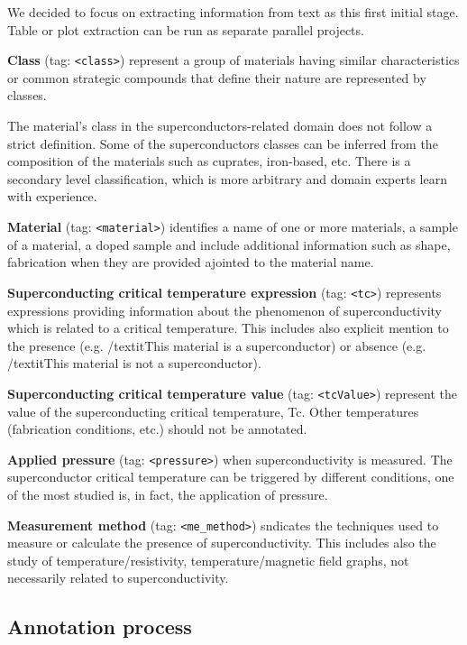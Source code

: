\documentclass[a4paper,10pt]{article}
\begin{document}
We decided to focus on extracting information from text as this first initial stage. Table or plot extraction can be run as separate parallel projects.  

\textbf{Class} (tag: \texttt{<class>}) represent a group of materials having similar characteristics or common strategic compounds that define their nature are represented by classes. 

The material’s class in the superconductors-related domain does not follow a strict definition. Some of the superconductors classes can be inferred from the composition of the materials such as cuprates, iron-based, etc. There is a secondary level classification, which is more arbitrary and domain experts learn with experience.

\textbf{Material} (tag: \texttt{<material>}) identifies a name of one or more materials, a sample of a material, a doped sample and include additional information such as shape, fabrication when they are provided  ajointed to the material name. 

\textbf{Superconducting critical temperature expression} (tag: \texttt{<tc>}) represents expressions providing information about the phenomenon of superconductivity which is related to a critical temperature. This includes also explicit mention to the presence (e.g. /textit{This material is a superconductor}) or absence (e.g. /textit{This material is not a superconductor}).

\textbf{Superconducting critical temperature value} (tag: \texttt{<tcValue>}) represent the value of the superconducting critical temperature, Tc. Other temperatures (fabrication conditions, etc.) should not be annotated.

\textbf{Applied pressure} (tag: \texttt{<pressure>}) when superconductivity is measured. The superconductor critical temperature can be triggered by different conditions, one of the most studied is, in fact, the application of pressure. 

\textbf{Measurement method} (tag: \texttt{<me\_method>}) sndicates the techniques used to measure or calculate the presence of superconductivity. This includes also the study of temperature/resistivity, temperature/magnetic field graphs, not necessarily related to superconductivity.

\subsection{Annotation process}
\label{sec:annotation-process}
\end{document}
